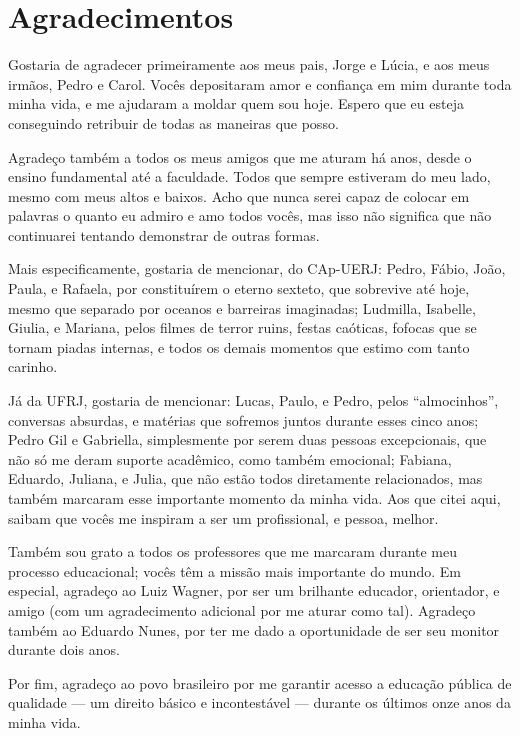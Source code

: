 \chapter*{Agradecimentos}

Gostaria de agradecer primeiramente aos meus pais, Jorge e Lúcia, e aos meus irmãos, Pedro e Carol. Vocês depositaram amor e confiança em mim durante toda minha vida, e me ajudaram a moldar quem sou hoje. Espero que eu esteja conseguindo retribuir de todas as maneiras que posso.

Agradeço também a todos os meus amigos que me aturam há anos, desde o ensino fundamental até a faculdade. Todos que sempre estiveram do meu lado, mesmo com meus altos e baixos. Acho que nunca serei capaz de colocar em palavras o quanto eu admiro e amo todos vocês, mas isso não significa que não continuarei tentando demonstrar de outras formas.

Mais especificamente, gostaria de mencionar, do CAp-UERJ: Pedro, Fábio, João, Paula, e Rafaela, por constituírem o eterno sexteto, que sobrevive até hoje, mesmo que separado por oceanos e barreiras imaginadas; Ludmilla, Isabelle, Giulia, e Mariana, pelos filmes de terror ruins, festas caóticas, fofocas que se tornam piadas internas, e todos os demais momentos que estimo com tanto carinho.

Já da UFRJ, gostaria de mencionar: Lucas, Paulo, e Pedro, pelos ``almocinhos'', conversas absurdas, e matérias que sofremos juntos durante esses cinco anos; Pedro Gil e Gabriella, simplesmente por serem duas pessoas excepcionais, que não só me deram suporte acadêmico, como também emocional; Fabiana, Eduardo, Juliana, e Julia, que não estão todos diretamente relacionados, mas também marcaram esse importante momento da minha vida. Aos que citei aqui, saibam que vocês me inspiram a ser um profissional, e pessoa, melhor.

Também sou grato a todos os professores que me marcaram durante meu processo educacional; vocês têm a missão mais importante do mundo. Em especial, agradeço ao Luiz Wagner, por ser um brilhante educador, orientador, e amigo (com um agradecimento adicional por me aturar como tal). Agradeço também ao Eduardo Nunes, por ter me dado a oportunidade de ser seu monitor durante dois anos.

Por fim, agradeço ao povo brasileiro por me garantir acesso a educação pública de qualidade --- um direito básico e incontestável --- durante os últimos onze anos da minha vida.
